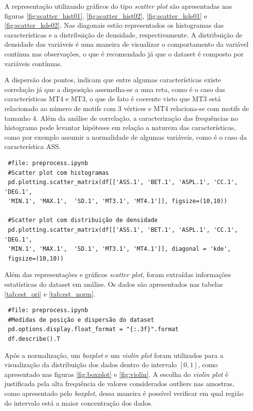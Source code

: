 \documentclass[
	article,			%
	11pt,				%
	oneside,			%
	a4paper,			%
	english,			%
	brazil,				%
	sumario=tradicional
	]{abntex2}
\begin{document}
A representação utilizando gráficos do tipo \textit{scatter plot} são apresentadas nas figuras \ref{fig:scatter_hist01}, \ref{fig:scatter_hist02}, \ref{fig:scatter_kde01} e \ref{fig:scatter_kde02}. Nas diagonais estão representados os histogramas das características e a distribuição de densidade, respectivamente. A distribuição de densidade das variáveis é uma maneira de visualizar o comportamento da variável contínua nas observações, o que é recomendado já que o dataset é composto por variáveis contínuas.

A dispersão dos pontos, indicam que entre algumas características existe correlação já que a disposição assemelha-se a uma reta, como é o caso das características MT4 e MT3, o que de fato é coerente visto que MT3 está relacionado ao número de motifs com $3$ vértices e MT4 relaciona-se com motifs de tamanho $4$. Além da análise de correlação, a caracterização das frequências no histograma pode levantar hipóteses em relação a natureza das características, como por exemplo assumir a normalidade de algumas variáveis, como é o caso da característica ASS.

\begin{verbatim}
 #file: preprocess.ipynb
 #Scatter plot com histogramas
 pd.plotting.scatter_matrix(df[['ASS.1', 'BET.1', 'ASPL.1', 'CC.1', 'DEG.1',
 'MIN.1', 'MAX.1',  'SD.1', 'MT3.1', 'MT4.1']], figsize=(10,10))
 
 #Scatter plot com distribuição de densidade
 pd.plotting.scatter_matrix(df[['ASS.1', 'BET.1', 'ASPL.1', 'CC.1', 'DEG.1',
 'MIN.1', 'MAX.1',  'SD.1', 'MT3.1', 'MT4.1']], diagonal = 'kde',
 figsize=(10,10))
\end{verbatim}

Além das representações e gráficos \textit{scatter plot}, foram extraídas informações estatísticas do dataset em análise. Os dados são apresentados nas tabelas \ref{tab:est_ori} e \ref{tab:est_norm}.

\begin{verbatim}
 #file: preprocess.ipynb
 #Medidas de posição e dispersão do dataset
 pd.options.display.float_format = "{:.3f}".format
 df.describe().T
\end{verbatim}


Após a normalização, um \textit{boxplot} e um \textit{violin plot} foram utilizados para a visualização da distribuição dos dados dentro do intervalo $[0,1]$, como apresentado nas figuras \ref{fig:boxplot} e \ref{fig:violin}. A escolha do \textit{violin plot} é justificada pela alta frequência de valores considerados outliers nas amostras, como apresentado pelo \textit{boxplot}, dessa maneira é possível verificar em qual região do intervalo está a maior concentração dos dados.
\end{document}
